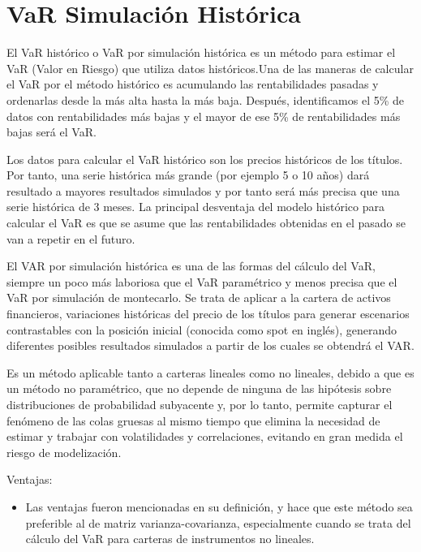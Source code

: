 \documentclass[
  12pt,
]{krantz}
\providecommand{\tightlist}{%
  \setlength{\itemsep}{0pt}\setlength{\parskip}{0pt}}
\begin{document}
\hypertarget{var-simulacion-historica}{%
\section{VaR Simulación Histórica}\label{var-simulacion-historica}}

El VaR histórico o VaR por simulación histórica es un método para estimar el VaR (Valor en Riesgo) que utiliza datos históricos.Una de las maneras de calcular el VaR por el método histórico es acumulando las rentabilidades pasadas y ordenarlas desde la más alta hasta la más baja. Después, identificamos el 5\% de datos con rentabilidades más bajas y el mayor de ese 5\% de rentabilidades más bajas será el VaR.

Los datos para calcular el VaR histórico son los precios históricos de los títulos. Por tanto, una serie histórica más grande (por ejemplo 5 o 10 años) dará resultado a mayores resultados simulados y por tanto será más precisa que una serie histórica de 3 meses. La principal desventaja del modelo histórico para calcular el VaR es que se asume que las rentabilidades obtenidas en el pasado se van a repetir en el futuro.

El VAR por simulación histórica es una de las formas del cálculo del VaR, siempre un poco más laboriosa que el VaR paramétrico y menos precisa que el VaR por simulación de montecarlo. Se trata de aplicar a la cartera de activos financieros, variaciones históricas del precio de los títulos para generar escenarios contrastables con la posición inicial (conocida como spot en inglés), generando diferentes posibles resultados simulados a partir de los cuales se obtendrá el VAR.

Es un método aplicable tanto a carteras lineales como no lineales, debido a que es un método no paramétrico, que no depende de ninguna de las hipótesis sobre distribuciones de probabilidad subyacente y, por lo tanto, permite capturar el fenómeno de las colas gruesas al mismo tiempo que elimina la necesidad de estimar y trabajar con volatilidades y correlaciones, evitando en gran medida el riesgo de modelización.

Ventajas:

\begin{itemize}
\tightlist
\item
  Las ventajas fueron mencionadas en su definición, y hace que este método sea preferible al de matriz varianza-covarianza, especialmente cuando se trata del cálculo del VaR para carteras de instrumentos no lineales.
\end{itemize}
\end{document}
